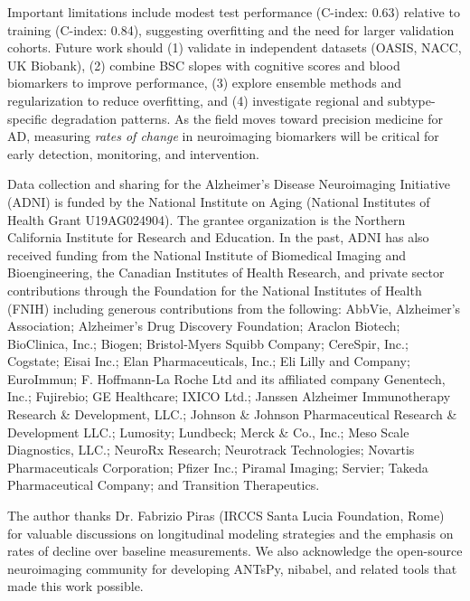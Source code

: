 \documentclass[blue]{ludusofficial}  %
\begin{document}
Important limitations include modest test performance (C-index: 0.63) relative to training (C-index: 0.84), suggesting overfitting and the need for larger validation cohorts. Future work should (1) validate in independent datasets (OASIS, NACC, UK Biobank), (2) combine BSC slopes with cognitive scores and blood biomarkers to improve performance, (3) explore ensemble methods and regularization to reduce overfitting, and (4) investigate regional and subtype-specific degradation patterns. As the field moves toward precision medicine for AD, measuring \textit{rates of change} in neuroimaging biomarkers will be critical for early detection, monitoring, and intervention.

\begin{acknowledgments}
Data collection and sharing for the Alzheimer's Disease Neuroimaging Initiative (ADNI) is funded by the National Institute on Aging (National Institutes of Health Grant U19AG024904). The grantee organization is the Northern California Institute for Research and Education. In the past, ADNI has also received funding from the National Institute of Biomedical Imaging and Bioengineering, the Canadian Institutes of Health Research, and private sector contributions through the Foundation for the National Institutes of Health (FNIH) including generous contributions from the following: AbbVie, Alzheimer's Association; Alzheimer's Drug Discovery Foundation; Araclon Biotech; BioClinica, Inc.; Biogen; Bristol-Myers Squibb Company; CereSpir, Inc.; Cogstate; Eisai Inc.; Elan Pharmaceuticals, Inc.; Eli Lilly and Company; EuroImmun; F. Hoffmann-La Roche Ltd and its affiliated company Genentech, Inc.; Fujirebio; GE Healthcare; IXICO Ltd.; Janssen Alzheimer Immunotherapy Research \& Development, LLC.; Johnson \& Johnson Pharmaceutical Research \& Development LLC.; Lumosity; Lundbeck; Merck \& Co., Inc.; Meso Scale Diagnostics, LLC.; NeuroRx Research; Neurotrack Technologies; Novartis Pharmaceuticals Corporation; Pfizer Inc.; Piramal Imaging; Servier; Takeda Pharmaceutical Company; and Transition Therapeutics.

The author thanks Dr. Fabrizio Piras (IRCCS Santa Lucia Foundation, Rome) for valuable discussions on longitudinal modeling strategies and the emphasis on rates of decline over baseline measurements. We also acknowledge the open-source neuroimaging community for developing ANTsPy, nibabel, and related tools that made this work possible.
\end{acknowledgments}



\end{document}
